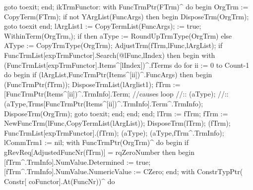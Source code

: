             goto toexit;
         end;
         ikTrmFunctor:
            with FuncTrmPtr(FTrm)^ do
         begin
            OrgTrm := CopyTerm(FTrm);
            if not YArgList(FuncArgs) then
            begin DisposeTrm(OrgTrm);
            goto toexit
            end;
            lArgList1 := CopyTermList(FuncArgs);
             := true;
            WithinTerm(OrgTrm,);
            if  then aType := RoundUpTrmType(OrgTrm)
            else AType := CopyTrmType(OrgTrm);
            AdjustTrm(fTrm,lFunc,lArgList);
            if FuncTrmList[expTrmFunctor].Search(@lFunc,lIndex) then
            begin
               with (FuncTrmList[expTrmFunctor].Items^[lIndex])^.fTerms do
                  for ii := 0 to Count-1 do
                  begin
                     if (lArgList,FuncTrmPtr(Items^[ii])^.FuncArgs) then
                     begin
                        (FuncTrmPtr(fTrm));
                        DisposeTrmList(lArglist1);
                        fTrm := [FuncTrmPtr(Items^[ii])^.TrmInfo].Term;
                        //causes loop
                        //::            (aType);
                        //::            (aType,Trms[FuncTrmPtr(Items^[ii])^.TrmInfo].Term^.TrmInfo);
                        DisposeTrm(OrgTrm);
                        goto toexit;
                     end;
                  end;
            end;
            lTrm := fTrm;
            fTrm := NewFuncTrm(lFunc,CopyTermList(lArgList));
            DisposeTrm(lTrm);
            (fTrm);
            FuncTrmList[expTrmFunctor].(fTrm);
            (aType);
            (aType,fTrm^.TrmInfo);
            lCommTrm1 := nil;
            with FuncTrmPtr(OrgTrm)^ do
            begin
               if gRevReq[AdjustedFuncNr(fTrm)] = rqZeroNumber then
               begin
                  [fTrm^.TrmInfo].NumValue.Determined := true;
                  [fTrm^.TrmInfo].NumValue.NumericValue := CZero;
               end;
               with ConstrTypPtr( Constr[ coFunctor].At(FuncNr))^ do
